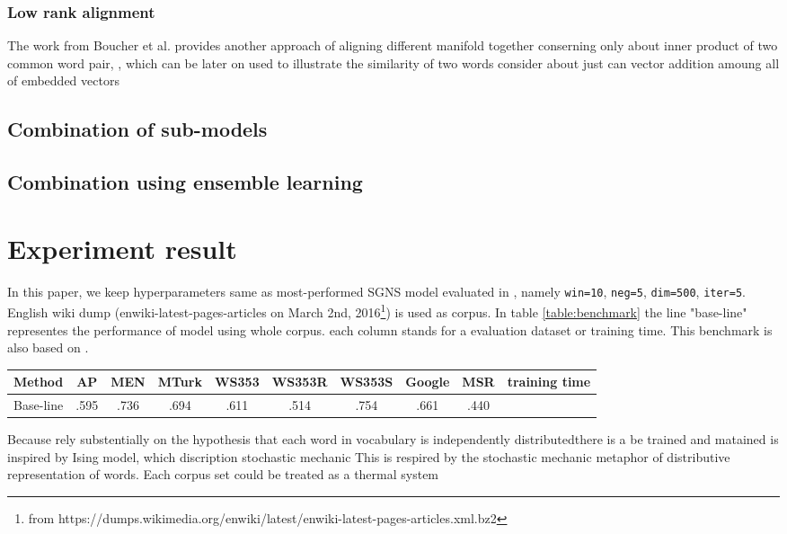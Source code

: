 \documentclass[11pt,a4paper]{article}
\begin{document}
  \subsubsection{Low rank alignment}
  The work from Boucher et al. \cite{boucher2015aligning} provides another approach of aligning different manifold together
  conserning only about inner product of two common word pair, , which can be later on used to illustrate the similarity of two words consider about just  can vector addition amoung all of embedded vectors 
  \subsection{Combination of sub-models}
  \subsection{Combination using ensemble learning}

\section{Experiment result}
In this paper, we keep hyperparameters same as most-performed SGNS model evaluated in \cite{levy2015improving}, namely \verb|win=10|, \verb|neg=5|, \verb|dim=500|, \verb|iter=5|. English wiki dump (enwiki-latest-pages-articles on March 2nd, 2016\footnote{from https://dumps.wikimedia.org/enwiki/latest/enwiki-latest-pages-articles.xml.bz2}) is used as corpus. In table \ref{table:benchmark} the line "base-line" representes the performance of model using whole corpus. each column stands for a evaluation dataset or training time. This benchmark is also based on \cite{levy2015improving}.
\begin{table*}
\caption{Performance and training time of different scalable strategies}
\begin{tabular}{c|cccccccc|c}
\hline
Method    & AP   & MEN  & MTurk & WS353 & WS353R & WS353S & Google & MSR  & training time\\ \hline
Base-line & .595 & .736 & .694  & .611  & .514   & .754   & .661   & .440 & \\ \hline
\end{tabular}
\label{table:benchmark}
\end{table*}

Because  rely substentially on the hypothesis that each word in vocabulary is independently distributedthere is a be trained and matained is inspired by Ising model, which discription stochastic mechanic This is respired by the stochastic mechanic metaphor of distributive representation of words. Each corpus set could be treated as a thermal system 
\end{document}
